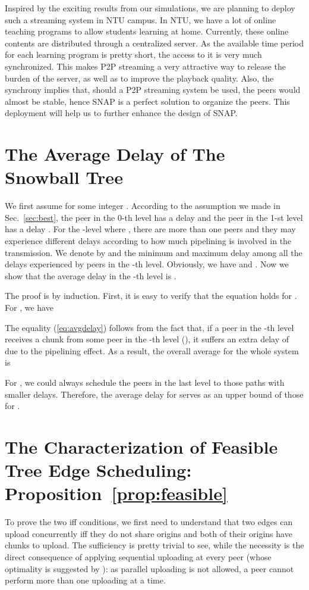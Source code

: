 \documentclass[conference]{IEEEtran}
\begin{document}
  Inspired by the exciting results from our simulations, we are planning to deploy such a streaming system in NTU campus. In NTU, we have a lot of online teaching programs to allow students learning at home. Currently, these online contents are distributed through a centralized server. As the available time period for each learning program is pretty short, the access to it is very much synchronized. This makes P2P streaming a very attractive way to release the burden of the server, as well as to improve the playback quality. Also, the synchrony implies that, should a P2P streaming system be used, the peers would almost be stable, hence SNAP is a perfect solution to organize the peers. This deployment will help us to further enhance the design of SNAP.




\appendices
\section{The Average Delay of The Snowball Tree} \label{sec:avg}
We first assume  for some integer . According to the assumption we made in Sec.~\ref{sec:best}, the peer in the 0-th level has a delay  and the peer in the 1-st level has a delay . For the -level where , there are more than one peers and they may experience different delays according to how much pipelining is involved in the transmission. We denote by  and  the minimum and maximum delay among all the delays experienced by peers in the -th level. Obviously, we have  and . Now we show that the average delay in the -th level is
   .

   The proof is by induction. First, it is easy to verify that the equation holds for . For , we have

The equality (\ref{eq:avgdelay}) follows from the fact that, if a peer in the -th level receives a chunk from some peer in the -th level (), it suffers an extra delay of  due to the pipelining effect. As a result, the overall average for the whole system is

For , we could always schedule the peers in the last level to those paths with smaller delays. Therefore, the average delay for  serves as an upper bound of those for .

\section{The Characterization of Feasible Tree Edge Scheduling: Proposition~\ref{prop:feasible}} \label{sec:tsch}
To prove the two iff conditions, we first need to understand that two edges can upload concurrently iff they do not share origins and both of their origins have chunks to upload. The sufficiency is pretty trivial to see, while the necessity is the direct consequence of applying sequential uploading at every peer (whose optimality is suggested by \cite{Liu-MM07}): as parallel uploading is not allowed, a peer cannot perform more than one uploading at a time.
\end{document}
